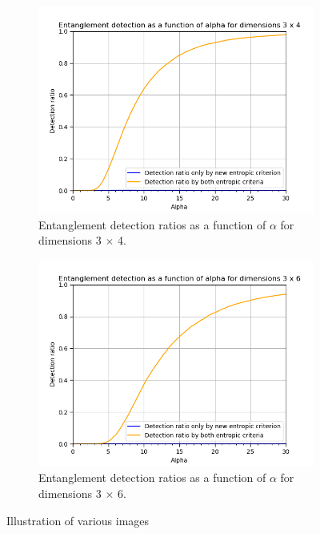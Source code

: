 \begin{figure}[ht]
\begin{subfigure}[b]{0.5\linewidth}
    \label{fig:renyi_3x3} 
    \vspace{2ex}
  \end{subfigure} 
  \begin{subfigure}[b]{0.5\linewidth}
    \centering
    \includegraphics[width=\linewidth]{images/renyi_comparison_3_4_30_0.2.png} 
    \caption{Entanglement detection ratios as a function of $\alpha$ for dimensions 3 $\times$ 4.} 
    \label{fig:renyi_3x4} 
  \end{subfigure}%
  \begin{subfigure}[b]{0.5\linewidth}
    \centering
    \includegraphics[width=\linewidth]{images/renyi_comparison_3_6_30_0.2.png} 
    \caption{Entanglement detection ratios as a function of $\alpha$ for dimensions 3 $\times$ 6.} 
    \label{fig:renyi_3x6} 
  \end{subfigure} 
  \caption{Illustration of various images}
  \label{fig:renyi_comparison} 
\end{figure}

